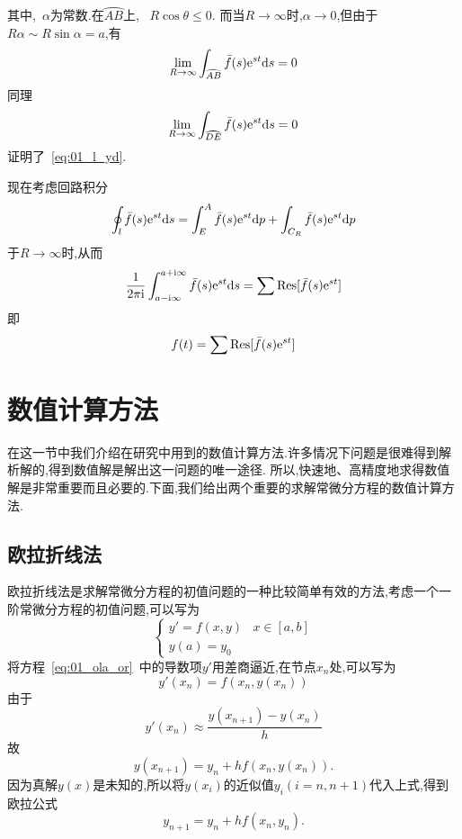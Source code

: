 其中,~$\alpha$为常数.在$\wideparen{AB}$上,
~$R\cos\theta\leq0$.
而当$R\to\infty$时,$\alpha\to0$,但由于$R\alpha\sim
R\sin\alpha=a$,有
\begin{equation*}
\lim_{R\to\infty}\int_{\wideparen{AB}}\bar{f}(s)\me^{st}\dif s=0
\end{equation*}
同理
\begin{equation*}
\lim_{R\to\infty}\int_{\wideparen{DE}}\bar{f}(s)\me^{st}\dif s=0
\end{equation*}
证明了~\eqref{eq:01_l_yd}.\par
现在考虑回路积分
\begin{equation*}
\oint_l\bar{f}(s)\mathrm{e}^{st}\mathrm{d} s=\int_E^A\bar{f}(s)\mathrm{e}^{st}\mathrm{d} p+\int_{C_R}\bar{f}(s)\mathrm{e}^{st}\mathrm{d} p
\end{equation*}
于$R\to\infty$时,从而
\begin{equation*}
 \dfrac{1}{2\pi\mathrm{i}}\int_{a-\mathrm{i}\infty}^{a+\mathrm{i}\infty}\bar{f}(s)\mathrm{e}^{st}\mathrm{d} s=
 \sum\mathrm{Res}[\bar{f}(s)\mathrm{e}^{st}]
\end{equation*}
即
\begin{equation}
 f(t)=\sum\mathrm{Res}[\bar{f}(s)\mathrm{e}^{st}]
\end{equation}
\section{数值计算方法}
在这一节中我们介绍在研究中用到的数值计算方法.许多情况下问题是很难得到解析解的,得到数值解是解出这一问题的唯一途径.
所以,快速地、高精度地求得数值解是非常重要而且必要的.下面,我们给出两个重要的求解常微分方程的数值计算方法.
\subsection{欧拉折线法}
欧拉折线法是求解常微分方程的初值问题的一种比较简单有效的方法,考虑一个一阶常微分方程的初值问题,可以写为
\begin{equation}\label{eq:01_ola_or}
 \begin{cases}
  y'=f(x,y)	&	x\in[a,b]	\\
  y(a)=y_0
 \end{cases}
\end{equation}
将方程~\eqref{eq:01_ola_or}~中的导数项$y'$用差商逼近,在节点$x_n$处,可以写为
\begin{equation}
 y'(x_n)=f(x_n,y(x_n))
\end{equation}
由于
\begin{equation*}
 y'(x_n)\approx\dfrac{y(x_{n+1})-y(x_n)}{h}
\end{equation*}
故
\begin{equation}
 y(x_{n+1})=y_n+hf(x_n,y(x_n)).
\end{equation}
因为真解$y(x)$是未知的,所以将$y(x_i)$的近似值$y_i(i=n,n+1)$代入上式,得到欧拉公式
\begin{equation}
 y_{n+1}=y_n+hf(x_n,y_n).
\end{equation}
